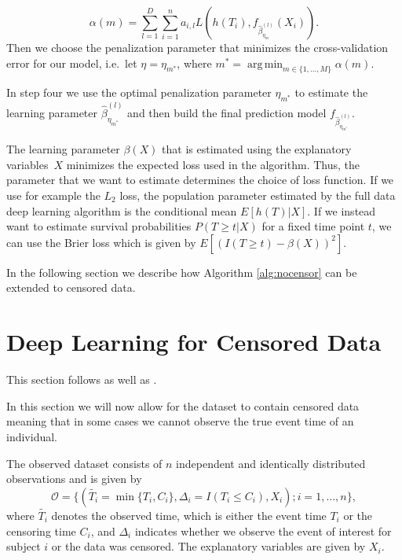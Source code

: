 \documentclass[12pt, a4paper]{scrartcl}
\theoremstyle{definition}
\theoremstyle{plain}
\numberwithin{equation}{section}
\numberwithin{figure}{section}
\numberwithin{table}{section}
\DeclareMathOperator*{\argmin}{arg\,min}
\begin{document}
	\begin{equation*}
	 \alpha(m) = \sum_{l=1}^D \sum_{i=1}^n a_{i,l} L(h(T_i), f_{\hat{\beta}_{\eta_m}^{(l)}}(X_i)).
 	\end{equation*}
 	Then we choose the penalization parameter that minimizes the cross-validation error for our model, i.e.~let $\eta = \eta_{m^*}$, where $m^* = \argmin_{m \in \{1,\dots,M\}} \alpha(m)$.
 	
 	In step four we use the optimal penalization parameter $\eta_{m^*}$ to estimate the learning parameter $\hat{\beta}_{\eta_{m^*}}^{(l)}$ and then build the final prediction model $f_{\hat{\beta}_{\eta_{m^*}}^{(l)}}$.
 	
 	The learning parameter $\beta(X)$ that is estimated using the explanatory variables~$X$ minimizes the expected loss used in the algorithm.
 	Thus, the parameter that we want to estimate determines the choice of loss function.
 	If we use for example the $L_2$ loss, the population parameter estimated by the full data deep learning algorithm is the conditional mean $E[h(T) \vert X]$.
 	If we instead want to estimate survival probabilities $P(T\geq t \vert X )$ for a fixed time point $t$, we can use the Brier loss which is given by $E[(I(T\geq t)-\beta(X))^2]$.
 	\enlargethispage{2em}
 	
 	In the following section we describe how Algorithm \ref{alg:nocensor} can be extended to censored data.
 	
	\newpage
	\section{Deep Learning for Censored Data} \label{censored}
	
	This section follows \citet*{basearticle} as well as \citet*{deeplbook}.
	
	In this section we will now allow for the dataset to contain censored data meaning that in some cases we cannot observe the true event time of an individual.
	
	The observed dataset consists of $n$ independent and identically distributed observations and is given by
	$$\mathcal{O} = \{(\tilde{T_i} = \min \{T_i, C_i\}, \Delta_i = I(T_i \leq C_i), X_i); i = 1,\dots,n\},$$
	 where $\tilde{T_i}$ denotes the observed time, which is either the event time $T_i$ or the censoring time $C_i$, and $\Delta_i$ indicates whether we observe the event of interest for subject $i$ or the data was censored.
	 The explanatory variables are given by $X_i$.
	 
\end{document}
